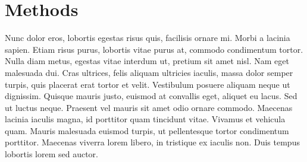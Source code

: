 \section{Methods}

Nunc dolor eros, lobortis egestas risus quis, facilisis ornare mi. Morbi a lacinia sapien. Etiam risus purus, lobortis vitae purus at, commodo condimentum tortor. Nulla diam metus, egestas vitae interdum ut, pretium sit amet nisl. Nam eget malesuada dui. Cras ultrices, felis aliquam ultricies iaculis, massa dolor semper turpis, quis placerat erat tortor et velit. Vestibulum posuere aliquam neque ut dignissim. Quisque mauris justo, euismod at convallis eget, aliquet eu lacus. Sed ut luctus neque. Praesent vel mauris sit amet odio ornare commodo. Maecenas lacinia iaculis magna, id porttitor quam tincidunt vitae. Vivamus et vehicula quam. Mauris malesuada euismod turpis, ut pellentesque tortor condimentum porttitor. Maecenas viverra lorem libero, in tristique ex iaculis non. Duis tempus lobortis lorem sed auctor.